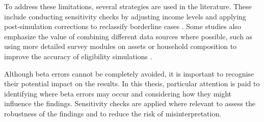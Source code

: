 To address these limitations, several strategies are used in the literature. 
These include conducting sensitivity checks by adjusting income levels and applying post-simulation corrections to reclassify borderline cases \citep{herber_non-take-up_2019}. 
Some studies also emphasize the value of combining different data sources where possible, such as using more detailed survey modules on assets or household composition to improve the accuracy of eligibility simulations \citep{janssens_takemod_2022}. 

Although beta errors cannot be completely avoided, it is important to recognise their potential impact on the results. 
In this thesis, particular attention is paid to identifying where beta errors may occur and considering how they might influence the findings. 
Sensitivity checks are applied where relevant to assess the robustness of the findings and to reduce the risk of misinterpretation. %



